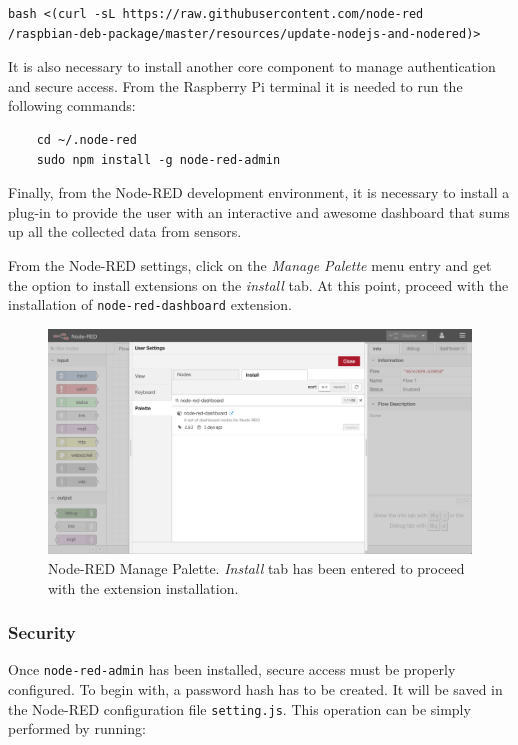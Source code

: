 \begin{verbatim}
bash <(curl -sL https://raw.githubusercontent.com/node-red
/raspbian-deb-package/master/resources/update-nodejs-and-nodered)>
\end{verbatim}

\noindent
It is also necessary to install another core component to manage authentication and secure access. From the Raspberry Pi terminal it is needed to run the following commands:

\begin{verbatim}
    cd ~/.node-red
    sudo npm install -g node-red-admin
\end{verbatim}

\noindent
Finally, from the Node-RED development environment, it is necessary to install a plug-in to provide the user with an interactive and awesome dashboard that sums up all the collected data from sensors.

From the Node-RED settings, click on the \textit{Manage Palette} menu entry and get the option to install extensions on the \textit{install} tab. At this point, proceed with the installation of \texttt{node-red-dashboard} extension.

\begin{figure}[H]
	\begin{center}
		\includegraphics[width=1.0\textwidth]{./pictures/node-red-dashboard}
		\caption{Node-RED Manage Palette. \textit{Install} tab has been entered to proceed with the extension installation.}
		\label{manage_palette_ui}
	\end{center}
\end{figure}

\subsubsection{Security}
Once \texttt{node-red-admin} has been installed, secure access must be properly configured.
To begin with, a password hash has to be created. It will be saved in the Node-RED configuration file \texttt{setting.js}. This operation can be simply performed by running:

